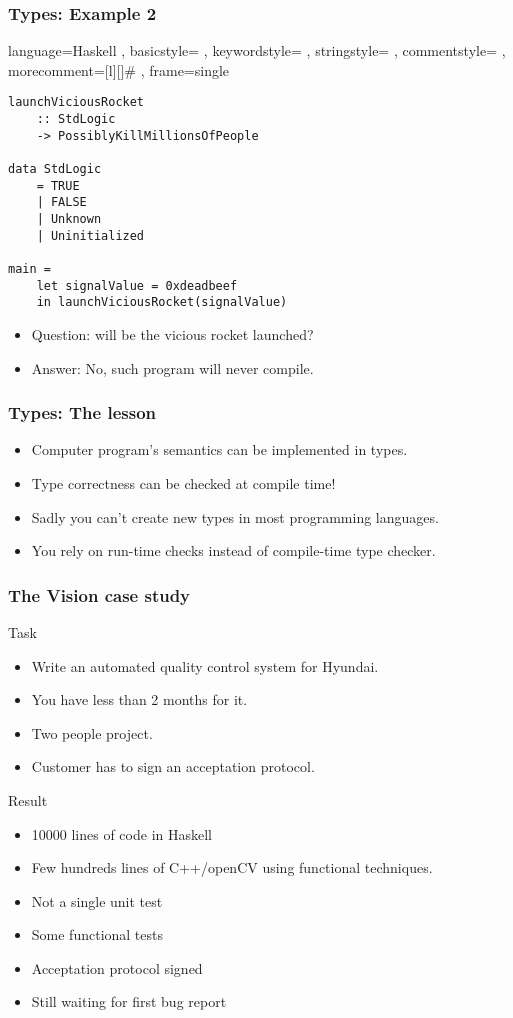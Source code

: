 \documentclass[11pt]{beamer}
\begin{document}
\begin{frame}[fragile]
\frametitle{Types: Example 2}
\lstset
{ language=Haskell
	, basicstyle=\ttfamily\footnotesize
	, keywordstyle=\color{blue}\ttfamily
	, stringstyle=\color{red}\ttfamily
	, commentstyle=\color{green}\ttfamily
	, morecomment=[l][\color{magenta}]{\#}
	, frame=single
}
\begin{lstlisting}
launchViciousRocket 
    :: StdLogic 
    -> PossiblyKillMillionsOfPeople

data StdLogic
    = TRUE
    | FALSE
    | Unknown
    | Uninitialized
	
main = 
    let signalValue = 0xdeadbeef 
    in launchViciousRocket(signalValue)		
\end{lstlisting}
\begin{itemize}[<+->]
	\item Question: will be the vicious rocket launched?
	\item Answer: No, such program will never compile.
\end{itemize}		
\end{frame}

\begin{frame}
	\frametitle{Types: The lesson}
	\begin{itemize}[<+->]
		\item Computer program's semantics can be implemented in types.
		\item Type correctness can be checked at compile time!
		\item Sadly you can't create new types in most programming languages.
		\item You rely on run-time checks instead of compile-time type checker.
	\end{itemize}	
\end{frame}

\begin{frame}
	\frametitle{The Vision case study}
	\begin{block}{Task}
		\begin{itemize}[<+->]
			\item Write an automated quality control system for Hyundai.
			\item You have less than 2 months for it.
			\item Two people project.
			\item Customer has to sign an acceptation protocol.
		\end{itemize}
	\end{block}
	\begin{block}{Result}
		\begin{itemize}[<+->]
			\item 10000 lines of code in Haskell
			\item Few hundreds lines of C++/openCV using functional techniques.
			\item Not a single unit test
			\item Some functional tests
			\item Acceptation protocol signed
			\item Still waiting for first bug report
		\end{itemize}
	\end{block}
\end{frame}
\end{document}
